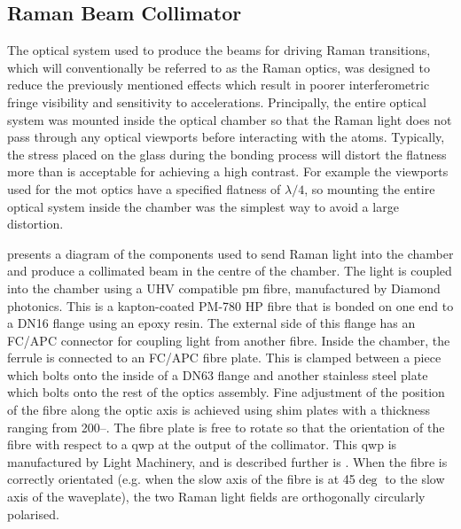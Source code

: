 \subsection{Raman Beam Collimator}\label{subsec:setup_ramancollimator}
The optical system used to produce the beams for driving Raman transitions, which will conventionally be referred to as the Raman optics, was designed to reduce the previously mentioned effects which result in poorer interferometric fringe visibility and sensitivity to accelerations. Principally, the entire optical system was mounted inside the optical chamber so that the Raman light does not pass through any optical viewports before interacting with the atoms. Typically, the stress placed on the glass during the bonding process will distort the flatness more than is acceptable for achieving a high contrast. For example the viewports used for the \ac{mot} optics have a specified flatness of \(\lambda/4\), so mounting the entire optical system inside the chamber was the simplest way to avoid a large distortion. \par\noindent
{} presents a diagram of the components used to send Raman light into the chamber and produce a collimated beam in the centre of the chamber. The light is coupled into the chamber using a UHV compatible \ac{pm} fibre, manufactured by Diamond photonics. This is a kapton-coated PM-780 HP fibre that is bonded on one end to a DN16 flange using an epoxy resin. The external side of this flange has an FC/APC connector for coupling light from another fibre. Inside the chamber, the ferrule is connected to an FC/APC fibre plate. This is clamped between a piece which bolts onto the inside of a DN63 flange and another stainless steel plate which bolts onto the rest of the optics assembly. Fine adjustment of the position of the fibre along the optic axis is achieved using shim plates with a thickness ranging from 200--. The fibre plate is free to rotate so that the orientation of the fibre with respect to a \ac{qwp} at the output of the collimator. This \ac{qwp} is manufactured by Light Machinery, and is described further is . When the fibre is correctly orientated (e.g. when the slow axis of the fibre is at 45\(\deg\) to the slow axis of the waveplate), the two Raman light fields are orthogonally circularly polarised. \par\noindent
